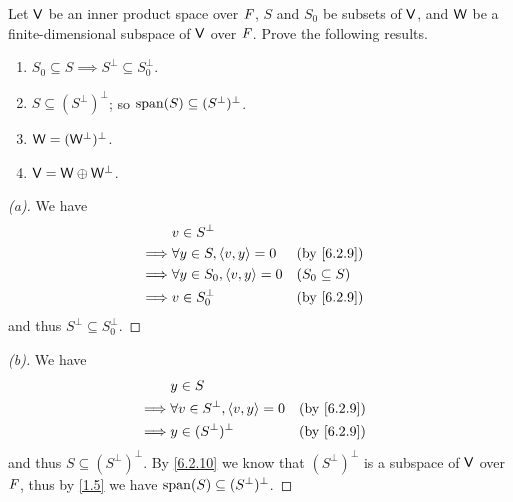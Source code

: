 \begin{ex}\label{ex:6.2.13}
  Let \(\mathsf{V}\) be an inner product space over \(\mathit{F}\), \(S\) and \(S_0\) be subsets of \(\mathsf{V}\), and \(\mathsf{W}\) be a finite-dimensional subspace of \(\mathsf{V}\) over \(\mathit{F}\).
  Prove the following results.
  \begin{enumerate}
    \item \(S_0 \subseteq S \implies S^{\perp} \subseteq S_0^{\perp}\).
    \item \(S \subseteq (S^{\perp})^{\perp}\);
          so \(\spn{S} \subseteq (S^{\perp})^{\perp}\).
    \item \(\mathsf{W} = (\mathsf{W}^{\perp})^{\perp}\).
    \item \(\mathsf{V} = \mathsf{W} \oplus \mathsf{W}^{\perp}\).
  \end{enumerate}
\end{ex}

\begin{proof}[(a)]
  We have
  \begin{align*}
             & v \in S^{\perp}                                          \\
    \implies & \forall y \in S, \inn{v, y} = 0   &  & \by{6.2.9}        \\
    \implies & \forall y \in S_0, \inn{v, y} = 0 &  & (S_0 \subseteq S) \\
    \implies & v \in S_0^{\perp}                 &  & \by{6.2.9}
  \end{align*}
  and thus \(S^{\perp} \subseteq S_0^{\perp}\).
\end{proof}

\begin{proof}[(b)]
  We have
  \begin{align*}
             & y \in S                                                 \\
    \implies & \forall v \in S^{\perp}, \inn{v, y} = 0 &  & \by{6.2.9} \\
    \implies & y \in (S^{\perp})^{\perp}               &  & \by{6.2.9}
  \end{align*}
  and thus \(S \subseteq (S^{\perp})^{\perp}\).
  By \cref{6.2.10} we know that \((S^{\perp})^{\perp}\) is a subspace of \(\mathsf{V}\) over \(\mathit{F}\), thus by \cref{1.5} we have \(\spn{S} \subseteq (S^{\perp})^{\perp}\).
\end{proof}

